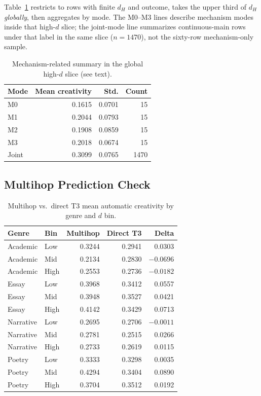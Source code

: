 \documentclass[sigconf,nonacm]{acmart}
\begin{document}
Table~\ref{tab:mechanism} restricts to rows with finite $d_H$ and outcome, takes the upper third of $d_H$ \emph{globally}, then aggregates by mode. The M0--M3 lines describe mechanism modes inside that high-$d$ slice; the joint-mode line summarizes continuous-main rows under that label in the same slice ($n{=}1470$), not the sixty-row mechanism-only sample.

\begin{table}[t]
\centering
\small
\begin{tabular}{lrrr}
\toprule
Mode & Mean creativity & Std. & Count \\
\midrule
M0 & 0.1615 & 0.0701 & 15 \\
M1 & 0.2044 & 0.0793 & 15 \\
M2 & 0.1908 & 0.0859 & 15 \\
M3 & 0.2018 & 0.0674 & 15 \\
Joint & 0.3099 & 0.0765 & 1470 \\
\bottomrule
\end{tabular}
\caption{Mechanism-related summary in the global high-$d$ slice (see text).}
\label{tab:mechanism}
\end{table}

\subsection{Multihop Prediction Check}

\begin{table}[t]
\centering
\small
\begin{tabular}{llrrr}
\toprule
Genre & Bin & Multihop & Direct T3 & Delta \\
\midrule
Academic & Low & 0.3244 & 0.2941 & 0.0303 \\
Academic & Mid & 0.2134 & 0.2830 & $-0.0696$ \\
Academic & High & 0.2553 & 0.2736 & $-0.0182$ \\
Essay & Low & 0.3968 & 0.3412 & 0.0557 \\
Essay & Mid & 0.3948 & 0.3527 & 0.0421 \\
Essay & High & 0.4142 & 0.3429 & 0.0713 \\
Narrative & Low & 0.2695 & 0.2706 & $-0.0011$ \\
Narrative & Mid & 0.2781 & 0.2515 & 0.0266 \\
Narrative & High & 0.2733 & 0.2619 & 0.0115 \\
Poetry & Low & 0.3333 & 0.3298 & 0.0035 \\
Poetry & Mid & 0.4294 & 0.3404 & 0.0890 \\
Poetry & High & 0.3704 & 0.3512 & 0.0192 \\
\bottomrule
\end{tabular}
\caption{Multihop vs.\ direct T3 mean automatic creativity by genre and $d$ bin.}
\label{tab:multihop}
\end{table}
\end{document}

